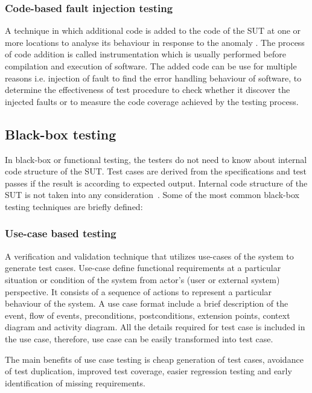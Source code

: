 {\subsubsection{Code-based fault injection testing}
A technique in which additional code is added to the code of the SUT at one or more locations to analyse its behaviour in response to the anomaly \cite{voas1997software}. The process of code addition is called instrumentation which is usually performed before compilation and execution of software. The added code can be use for multiple reasons i.e. injection of fault to find the error handling behaviour of software, to determine the effectiveness of test procedure to check whether it discover the injected faults or to measure the code coverage achieved by the testing process.    

\subsection{Black-box testing}
In black-box or functional testing, the testers do not need to know about internal code structure of the SUT. Test cases are derived from the specifications and test passes if the result is according to expected output. Internal code structure of the SUT is not taken into any consideration~\cite{beizer1995black}. Some of the most common black-box testing techniques are briefly defined:

\subsubsection{Use-case based testing}
A verification and validation technique that utilizes use-cases of the system to generate test cases. Use-case define functional requirements at a particular situation or condition of the system from actor's (user or external system) perspective. It consists of a sequence of actions to represent a particular behaviour of the system. A use case format include a brief description of the event, flow of events, preconditions, postconditions, extension points, context diagram and activity diagram. 
All the details required for test case is included in the use case, therefore, use case can be easily transformed into test case. 


The main benefits of use case testing is cheap generation of test cases, avoidance of test duplication, improved test coverage, easier regression testing and early identification of missing requirements.  

}
